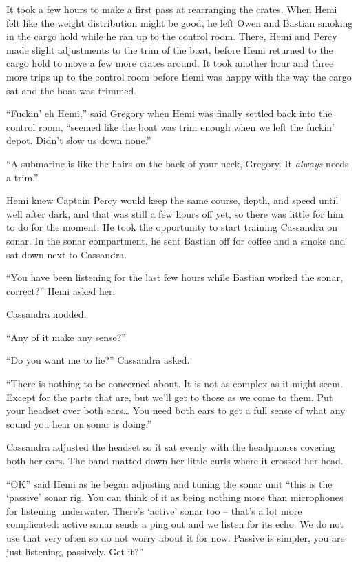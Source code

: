 \documentclass[
]{scrbook}
\begin{document}
It took a few hours to make a first pass at rearranging the crates. When
Hemi felt like the weight distribution might be good, he left Owen and
Bastian smoking in the cargo hold while he ran up to the control room.
There, Hemi and Percy made slight adjustments to the trim of the boat,
before Hemi returned to the cargo hold to move a few more crates around.
It took another hour and three more trips up to the control room before
Hemi was happy with the way the cargo sat and the boat was trimmed.

``Fuckin' eh Hemi,'' said Gregory when Hemi was finally settled back
into the control room, ``seemed like the boat was trim enough when we
left the fuckin' depot. Didn't slow us down none.''

``A submarine is like the hairs on the back of your neck, Gregory. It
\emph{always} needs a trim.''

Hemi knew Captain Percy would keep the same course, depth, and speed
until well after dark, and that was still a few hours off yet, so there
was little for him to do for the moment. He took the opportunity to
start training Cassandra on sonar. In the sonar compartment, he sent
Bastian off for coffee and a smoke and sat down next to Cassandra.

``You have been listening for the last few hours while Bastian worked
the sonar, correct?'' Hemi asked her.

Cassandra nodded.

``Any of it make any sense?''

``Do you want me to lie?'' Cassandra asked.

``There is nothing to be concerned about. It is not as complex as it
might seem. Except for the parts that are, but we'll get to those as we
come to them. Put your headset over both ears\ldots{} You need both ears
to get a full sense of what any sound you hear on sonar is doing.''

Cassandra adjusted the headset so it sat evenly with the headphones
covering both her ears. The band matted down her little curls where it
crossed her head.

``OK'' said Hemi as he began adjusting and tuning the sonar unit ``this
is the `passive' sonar rig. You can think of it as being nothing more
than microphones for listening underwater. There's `active' sonar too --
that's a lot more complicated: active sonar sends a ping out and we
listen for its echo. We do not use that very often so do not worry about
it for now. Passive is simpler, you are just listening, passively. Get
it?''
\end{document}
